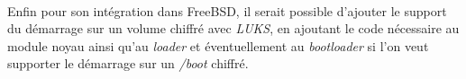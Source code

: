 \paragraph{}
Enfin pour son intégration dans FreeBSD, il serait possible d'ajouter le support
du démarrage sur un volume chiffré avec {\em LUKS}, en ajoutant le code
nécessaire au module noyau ainsi qu'au {\em loader} et éventuellement au
{\em bootloader} si l'on veut supporter le démarrage sur un {\em /boot} chiffré.


